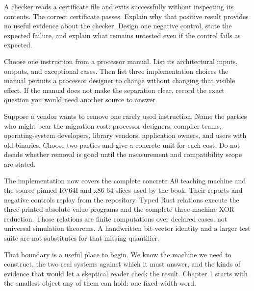 \begin{tryit}[title={\iconTryIt\ Attack: the checker that always accepts}]
A checker reads a certificate file and exits successfully without inspecting
its contents. The correct certificate passes. Explain why that positive result
provides no useful evidence about the checker. Design one negative control,
state the expected failure, and explain what remains untested even if the
control fails as expected.
\end{tryit}

\begin{tryit}[title={\iconTryIt\ Transfer: separate architecture from implementation}]
Choose one instruction from a processor manual. List its architectural inputs,
outputs, and exceptional cases. Then list three implementation choices the
manual permits a processor designer to change without changing that visible
effect. If the manual does not make the separation clear, record the exact
question you would need another source to answer.
\end{tryit}

\begin{tryit}[title={\iconTryIt\ Generalize: price a compatibility choice}]
Suppose a vendor wants to remove one rarely used instruction. Name the parties
who might bear the migration cost: processor designers, compiler teams,
operating-system developers, library vendors, application owners, and users
with old binaries. Choose two parties and give a concrete unit for each cost.
Do not decide whether removal is good until the measurement and compatibility
scope are stated.
\end{tryit}

The implementation now covers the complete concrete A0 teaching machine and
the source-pinned RV64I and x86-64 slices used by the book. Their reports and
negative controls replay from the repository. Typed Rust relations execute the
three printed absolute-value programs and the complete three-machine XOR
reduction. Those relations are finite computations over declared cases, not
universal simulation theorems. A handwritten bit-vector identity and a larger
test suite are not substitutes for that missing quantifier.

That boundary is a useful place to begin. We know the machine we need to
construct, the two real systems against which it must answer, and the kinds of
evidence that would let a skeptical reader check the result. Chapter 1 starts
with the smallest object any of them can hold: one fixed-width word.

